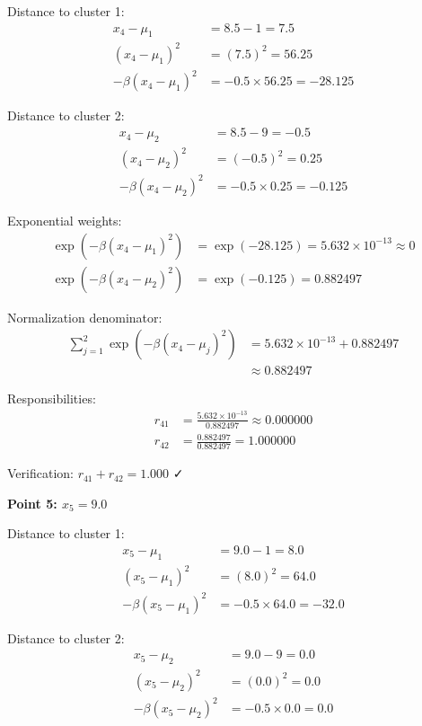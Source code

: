 \documentclass[12pt]{article}
\begin{document}
\begin{solution}
Distance to cluster 1:
\begin{align*}
x_4 - \mu_1 &= 8.5 - 1 = 7.5 \\
(x_4 - \mu_1)^2 &= (7.5)^2 = 56.25 \\
-\beta(x_4 - \mu_1)^2 &= -0.5 \times 56.25 = -28.125
\end{align*}

Distance to cluster 2:
\begin{align*}
x_4 - \mu_2 &= 8.5 - 9 = -0.5 \\
(x_4 - \mu_2)^2 &= (-0.5)^2 = 0.25 \\
-\beta(x_4 - \mu_2)^2 &= -0.5 \times 0.25 = -0.125
\end{align*}

Exponential weights:
\begin{align*}
\exp(-\beta(x_4 - \mu_1)^2) &= \exp(-28.125) = 5.632 \times 10^{-13} \approx 0 \\
\exp(-\beta(x_4 - \mu_2)^2) &= \exp(-0.125) = 0.882497
\end{align*}

Normalization denominator:
\begin{align*}
\sum_{j=1}^2 \exp(-\beta(x_4 - \mu_j)^2) &= 5.632 \times 10^{-13} + 0.882497 \\
&\approx 0.882497
\end{align*}

Responsibilities:
\begin{align*}
r_{41} &= \frac{5.632 \times 10^{-13}}{0.882497} \approx 0.000000 \\
r_{42} &= \frac{0.882497}{0.882497} = 1.000000
\end{align*}

Verification: $r_{41} + r_{42} = 1.000$ ✓

\textbf{Point 5: $x_5 = 9.0$}

Distance to cluster 1:
\begin{align*}
x_5 - \mu_1 &= 9.0 - 1 = 8.0 \\
(x_5 - \mu_1)^2 &= (8.0)^2 = 64.0 \\
-\beta(x_5 - \mu_1)^2 &= -0.5 \times 64.0 = -32.0
\end{align*}

Distance to cluster 2:
\begin{align*}
x_5 - \mu_2 &= 9.0 - 9 = 0.0 \\
(x_5 - \mu_2)^2 &= (0.0)^2 = 0.0 \\
-\beta(x_5 - \mu_2)^2 &= -0.5 \times 0.0 = 0.0
\end{align*}


\end{solution}
\end{document}

